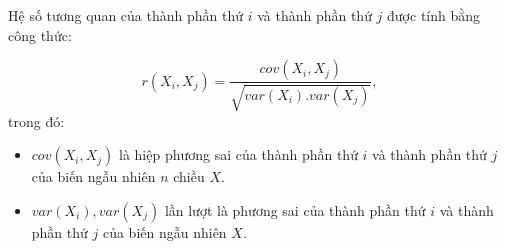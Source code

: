 \documentclass[14pt]{extreport}
\theoremstyle{definition}
\theoremstyle{plain}
\theoremstyle{remark}
\begin{document}
\begin{appendices}
\begin{flushleft}
Hệ số tương quan của thành phần thứ $i$ và thành phần thứ $j$ được tính bằng công thức:
\end{flushleft}
\begin{equation}
r(X_i, X_j) = \dfrac{cov(X_i,X_j)}{\sqrt{var(X_i).var(X_j)}},
\end{equation}
trong đó:
\begin{itemize}
\item $cov(X_i,X_j)$ là hiệp phương sai của thành phần thứ $i$ và thành phần thứ $j$ của biến ngẫu nhiên $n$ chiều $X$.
\item $var(X_i), var(X_j)$ lần lượt là phương sai của thành phần thứ $i$ và thành phần thứ $j$ của biến ngẫu nhiên $X$.
\end{itemize}

\end{appendices}
\end{document}
